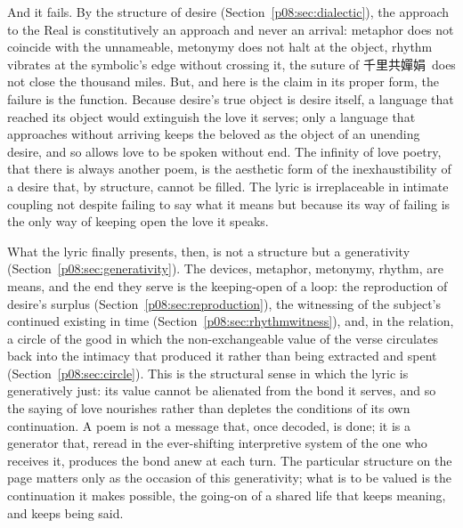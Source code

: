 And it fails. By the structure of desire (Section~\ref{p08:sec:dialectic}), the approach to the Real is constitutively an approach and never an arrival: metaphor does not coincide with the unnameable, metonymy does not halt at the object, rhythm vibrates at the symbolic's edge without crossing it, the suture of \cjkfont 千里共嬋娟\normalfont\ does not close the thousand miles. But, and here is the claim in its proper form, the failure is the function. Because desire's true object is desire itself, a language that reached its object would extinguish the love it serves; only a language that approaches without arriving keeps the beloved as the object of an unending desire, and so allows love to be spoken without end. The infinity of love poetry, that there is always another poem, is the aesthetic form of the inexhaustibility of a desire that, by structure, cannot be filled. The lyric is irreplaceable in intimate coupling not despite failing to say what it means but because its way of failing is the only way of keeping open the love it speaks.

What the lyric finally presents, then, is not a structure but a generativity (Section~\ref{p08:sec:generativity}). The devices, metaphor, metonymy, rhythm, are means, and the end they serve is the keeping-open of a loop: the reproduction of desire's surplus (Section~\ref{p08:sec:reproduction}), the witnessing of the subject's continued existing in time (Section~\ref{p08:sec:rhythmwitness}), and, in the relation, a circle of the good in which the non-exchangeable value of the verse circulates back into the intimacy that produced it rather than being extracted and spent (Section~\ref{p08:sec:circle}). This is the structural sense in which the lyric is generatively just: its value cannot be alienated from the bond it serves, and so the saying of love nourishes rather than depletes the conditions of its own continuation. A poem is not a message that, once decoded, is done; it is a generator that, reread in the ever-shifting interpretive system of the one who receives it, produces the bond anew at each turn. The particular structure on the page matters only as the occasion of this generativity; what is to be valued is the continuation it makes possible, the going-on of a shared life that keeps meaning, and keeps being said.

